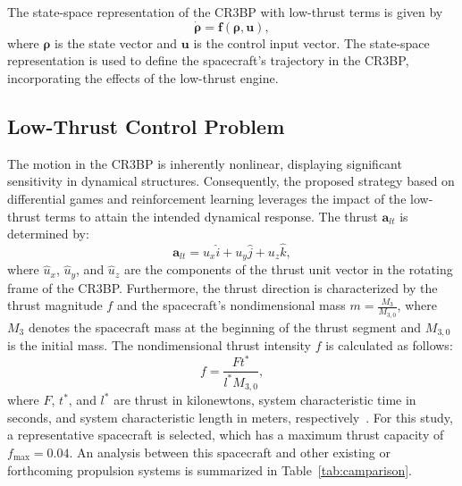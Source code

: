 \documentclass[conference]{IEEEtran}
\begin{document}
The state-space representation of the CR3BP with low-thrust terms is given by
\begin{equation}
	\dot{\boldsymbol{\rho}} = \boldsymbol{f}(\boldsymbol{\rho}, \boldsymbol{u}),
\end{equation}
where \( \boldsymbol{\rho} \) is the state vector and \( \boldsymbol{u} \) is the control input vector. The state-space representation is used to define the spacecraft's trajectory in the CR3BP, incorporating the effects of the low-thrust engine.


\subsection{Low-Thrust Control Problem}
The motion in the CR3BP is inherently nonlinear, displaying significant sensitivity in dynamical structures. Consequently, the proposed strategy based on differential games and reinforcement learning leverages the impact of the low-thrust terms to attain the intended dynamical response. The thrust \(\mathbf{a}_{lt}\) is determined by:
\begin{equation}
\mathbf{a}_{lt} =  {u}_x \hat{i} + {u}_y \hat{j} + {u}_z \hat{k},
\end{equation}
where \( \hat{u}_x \), \( \hat{u}_y \), and \( \hat{u}_z \) are the components of the thrust unit vector in the rotating frame of the CR3BP. Furthermore, the thrust direction is characterized by the thrust magnitude \( f \) and the spacecraft's nondimensional mass \( m = \frac{M_3}{M_{3,0}} \), where \( M_3 \) denotes the spacecraft mass at the beginning of the thrust segment and \( M_{3,0} \) is the initial mass.
The nondimensional thrust intensity \( f \) is calculated as follows:
\begin{equation}
f = \dfrac{Ft^*}{l^* M_{3,0}},
\end{equation}
where \( F \), \(t^*\), and \(l^*\) are thrust in kilonewtons, system characteristic time in seconds, and system characteristic length in meters, respectively~\cite{lafarge}.
For this study, a representative spacecraft is selected, which has a maximum thrust capacity of \( f_{\text{max}} = 0.04 \). An analysis between this spacecraft and other existing or forthcoming propulsion systems is summarized in Table~\ref{tab:camparison}.
\end{document}

